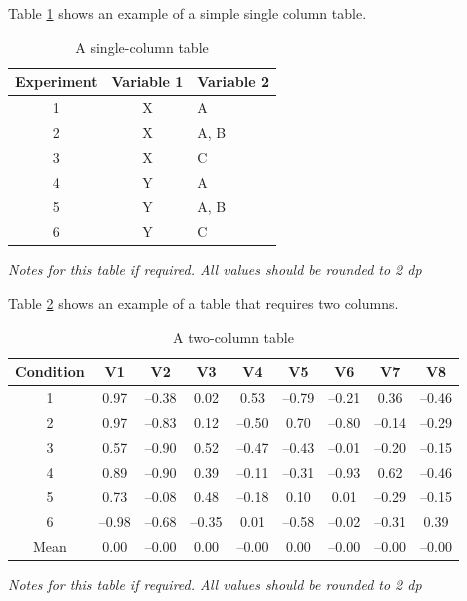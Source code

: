 \documentclass[paper=a4,fontsize=11pt,twocolumn]{article}
\begin{document}
Table \ref{tab:one-column} shows an example of a simple single column table.

\begin{table}
\begin{centering}
\caption{A single-column table}\label{tab:one-column}
	\begin{tabular}[\columnwidth]{ccl}\toprule
		Experiment &  Variable 1 &  Variable 2 \\
		\midrule
		1  & X & A \\
		2  & X & A, B \\
		3  & X & C \\
		4  & Y & A \\
		5  & Y & A, B \\
		6  & Y & C \\
		\bottomrule
	\end{tabular}\par
	\medskip
\textit{Notes for this table if required. All values should be rounded to 2 dp}
\end{centering}
\end{table}

Table \ref{tab:two-column} shows an example of a table that requires two columns.

\begin{table}
\begin{centering}
\caption{A two-column table}\label{tab:two-column}%
	\begin{tabular}[\columnwidth]{ccccccccc}\toprule
	Condition & V1 & V2 & V3 & V4 & V5 & V6 & V7 & V8 \\
	\midrule
	1 & 0.97 & --0.38 & 0.02 & 0.53 & --0.79 & --0.21 & 0.36 & --0.46 \\
	2 & 0.97 & --0.83 & 0.12 & --0.50 & 0.70 & --0.80 & --0.14 & --0.29 \\
	3 & 0.57 & --0.90 & 0.52 & --0.47 & --0.43 & --0.01 & --0.20 & --0.15 \\
	4 & 0.89 & --0.90 & 0.39 & --0.11 & --0.31 & --0.93 & 0.62 & --0.46 \\
	5 & 0.73 & --0.08 & 0.48 & --0.18 & 0.10 & 0.01 & --0.29 & --0.15 \\
	6 & --0.98 & --0.68 & --0.35 & 0.01 & --0.58 & --0.02 & --0.31 & 0.39 \\
	\cmidrule{2-9}
	Mean & 0.00 & --0.00 & 0.00 & --0.00 & 0.00 & --0.00 & --0.00 & --0.00 \\
	\bottomrule
	\end{tabular}\par
	\medskip
\textit{Notes for this table if required. All values should be rounded to 2 dp}
\end{centering}
\end{table}
\end{document}
